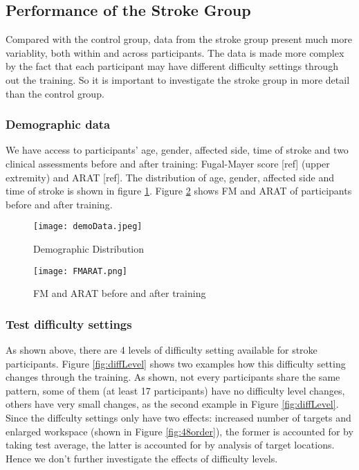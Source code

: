 \subsection{Performance of the Stroke Group}

Compared with the control group, data from the stroke group present much more variablity, both within and across participants. The data is made more complex by the fact that each participant may have different difficulty settings through out the training. So it is important to investigate the stroke group in more detail than the control group.

\subsubsection{Demographic data}

We have access to participants' age, gender, affected side, time of stroke and two clinical assessments before and after training: Fugal-Mayer score [ref] (upper extremity) and ARAT [ref]. The distribution of age, gender, affected side and time of stroke is shown in figure \ref{fig:demoData}. Figure \ref{fig:FMARAT} shows FM and ARAT of participants before and after training.

\begin{figure} %
	\texttt{[image: demoData.jpeg]}
	\centering
	\caption{Demographic Distribution}
	\medskip
	\small 
	\label{fig:demoData}
\end{figure}

\begin{figure} %
	\texttt{[image: FMARAT.png]}
	\centering
	\caption{FM and ARAT before and after training}
	\medskip
	\small 
	\label{fig:FMARAT}
\end{figure}

\subsubsection{Test difficulty settings}

As shown above, there are 4 levels of difficulty setting available for stroke participants. Figure \ref{fig:diffLevel} shows two examples how this difficulty setting changes through the training. As shown, not every participants share the same pattern, some of them (at least 17 participants) have no difficulty level changes, others have very small changes, as the second example in Figure \ref{fig:diffLevel}. Since the diffculty settings only have two effects: increased number of targets and enlarged workspace (shown in Figure \ref{fig:48order}), the former is accounted for by taking test average, the latter is accounted for by analysis of target locations. Hence we don't further investigate the effects of difficulty levels.

